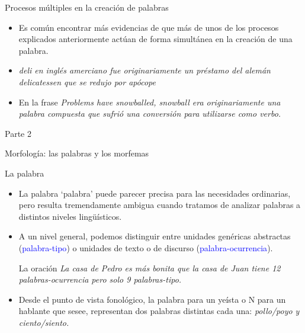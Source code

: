 \documentclass{beamer}
\begin{document}
\begin{frame}{Procesos múltiples en la creación de palabras}
	
\begin{itemize}
	\item Es común encontrar más evidencias de que más de unos de los procesos explicados anteriormente actúan de forma simultánea en la creación de una palabra.
	
	\item \it{deli} en inglés amerciano fue originariamente un préstamo del alemán \it{delicatessen} que se redujo por apócope

	\item En la frase \it{Problems have snowballed}, \it{snowball} era originariamente una palabra compuesta que sufrió una conversión para utilizarse como verbo.

\end{itemize}
\end{frame}


\begin{frame}{Parte 2}

\begin{center}
  \LARGE{Morfología: las palabras y los morfemas}
\end{center} 

\end{frame}


\begin{frame}{La palabra}

\begin{itemize}
	\item La palabra `palabra' puede parecer precisa para las necesidades ordinarias, pero resulta tremendamente ambigua cuando tratamos de analizar palabras a distintos niveles lingüísticos.
	\item A un nivel general, podemos distinguir entre unidades genéricas abstractas (\textcolor{blue}{palabra-tipo}) o unidades de texto o de discurso (\textcolor{blue}{palabra-ocurrencia}).
	
	La oración \it{La casa de Pedro es más bonita que la casa de Juan} tiene 12 palabras-ocurrencia pero solo 9 palabras-tipo.
	\item Desde el punto de vista fonológico, la palabra  para un yeísta o N para un hablante que sesee, representan dos palabras distintas cada una: \it{pollo/poyo} y \it{ciento/siento}. 
\end{itemize}
\end{frame}
	
\end{document}
